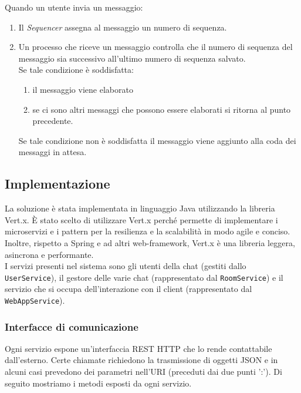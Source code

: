 \documentclass[a4paper]{article}
\begin{document}
Quando un utente invia un messaggio:
\begin{enumerate}
    \item Il \textit{Sequencer} assegna al messaggio un numero di sequenza. 
    \item Un processo che riceve un messaggio controlla che il numero di sequenza del messaggio sia successivo all'ultimo numero di sequenza salvato.\\
    Se tale condizione è soddisfatta:
    \begin{enumerate}
        \item il messaggio viene elaborato
        \item se ci sono altri messaggi che possono essere elaborati si ritorna al punto precedente.
    \end{enumerate}
    Se tale condizione non è soddisfatta il messaggio viene aggiunto alla coda dei messaggi in attesa.
\end{enumerate}


\subsection{Implementazione}\label{implementazione}

La soluzione è stata implementata in linguaggio Java utilizzando la libreria Vert.x. \`E stato scelto di utilizzare Vert.x perché permette di implementare i microservizi e i pattern per la resilienza e la scalabilità in modo agile e conciso. Inoltre, rispetto a Spring e ad altri web-framework, Vert.x è una libreria leggera, asincrona e performante.\\
I servizi presenti nel sistema sono gli utenti della chat (gestiti dallo \texttt{UserService}), il gestore delle varie chat (rappresentato dal \texttt{RoomService}) e il servizio che si occupa dell'interazione con il client (rappresentato dal \texttt{WebAppService}).
 
\subsubsection{Interfacce di comunicazione}\label{interfacce-di-comunicazione}

Ogni servizio espone un'interfaccia REST HTTP che lo rende contattabile dall'esterno. Certe chiamate richiedono la trasmissione di oggetti JSON e in alcuni casi prevedono dei parametri nell'URI (preceduti dai due punti ':').  
Di seguito mostriamo i metodi esposti da ogni servizio.
\end{document}
